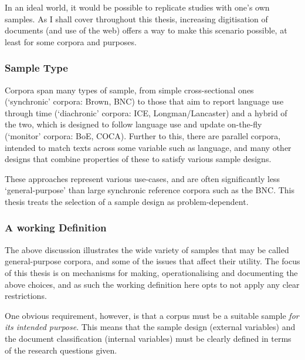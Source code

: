 
In an ideal world, it would be possible to replicate studies with one's own samples.  As I shall cover throughout this thesis, increasing digitisation of documents (and use of the web) offers a way to make this scenario possible, at least for some corpora and purposes.



\subsubsection{Sample Type}
Corpora span many types of sample, from simple cross-sectional ones (`synchronic' corpora: Brown, BNC) to those that aim to report language use through time (`diachronic' corpora: ICE, Longman/Lancaster) and a hybrid of the two, which is designed to follow language use and update on-the-fly (`monitor' corpora: BoE, COCA)\cite{francis1961brown,burnard1995users,greenbaum1996international,summers1993longman,Jarvinen1994AMW991886.991985,davies2010corpus}.  Further to this, there are parallel corpora, intended to match texts across some variable such as language\cite{koehn2005europarl,mcenery2007parallel}, and many other designs that combine properties of these to satisfy various sample designs.

These approaches represent various use-cases, and are often significantly less `general-purpose' than large synchronic reference corpora such as the BNC.  This thesis treats the selection of a sample design as problem-dependent.








\subsubsection{A working Definition}
The above discussion illustrates the wide variety of samples that may be called general-purpose corpora, and some of the issues that affect their utility.  The focus of this thesis is on mechanisms for making, operationalising and documenting the above choices, and as such the working definition here opts to not apply any clear restrictions.

One obvious requirement, however, is that a corpus must be a suitable sample \textsl{for its intended purpose}.  This means that the sample design (external variables) and the document classification (internal variables) must be clearly defined in terms of the research questions given.

